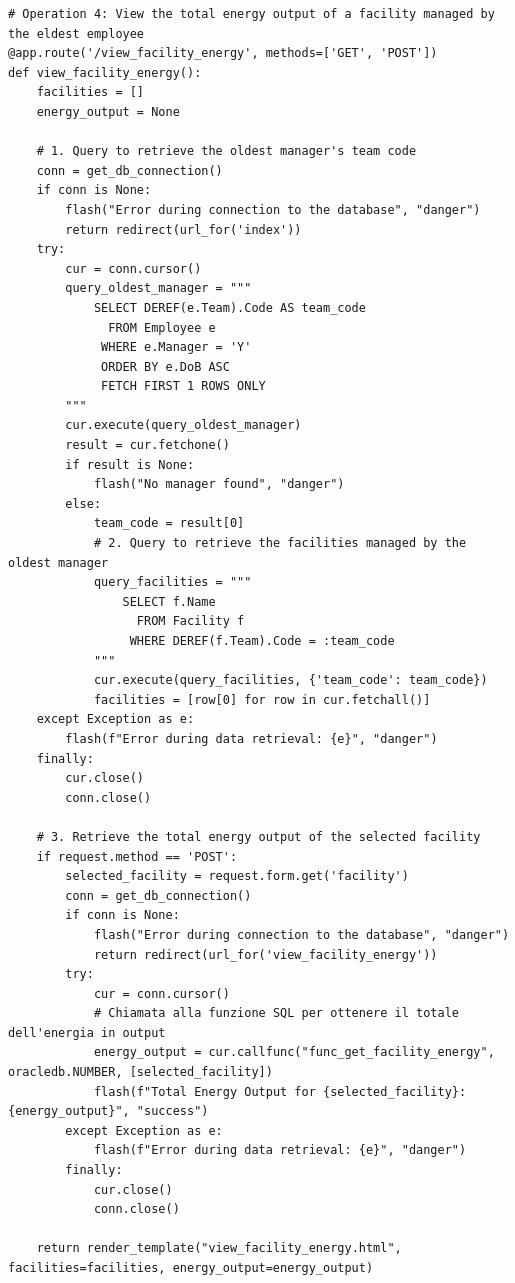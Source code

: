 \begin{lstlisting}
# Operation 4: View the total energy output of a facility managed by the eldest employee
@app.route('/view_facility_energy', methods=['GET', 'POST'])
def view_facility_energy():
    facilities = []
    energy_output = None

    # 1. Query to retrieve the oldest manager's team code
    conn = get_db_connection()
    if conn is None:
        flash("Error during connection to the database", "danger")
        return redirect(url_for('index'))
    try:
        cur = conn.cursor()
        query_oldest_manager = """
            SELECT DEREF(e.Team).Code AS team_code
              FROM Employee e
             WHERE e.Manager = 'Y'
             ORDER BY e.DoB ASC
             FETCH FIRST 1 ROWS ONLY
        """
        cur.execute(query_oldest_manager)
        result = cur.fetchone()
        if result is None:
            flash("No manager found", "danger")
        else:
            team_code = result[0]
            # 2. Query to retrieve the facilities managed by the oldest manager
            query_facilities = """
                SELECT f.Name 
                  FROM Facility f
                 WHERE DEREF(f.Team).Code = :team_code
            """
            cur.execute(query_facilities, {'team_code': team_code})
            facilities = [row[0] for row in cur.fetchall()]
    except Exception as e:
        flash(f"Error during data retrieval: {e}", "danger")
    finally:
        cur.close()
        conn.close()

    # 3. Retrieve the total energy output of the selected facility
    if request.method == 'POST':
        selected_facility = request.form.get('facility')
        conn = get_db_connection()
        if conn is None:
            flash("Error during connection to the database", "danger")
            return redirect(url_for('view_facility_energy'))
        try:
            cur = conn.cursor()
            # Chiamata alla funzione SQL per ottenere il totale dell'energia in output
            energy_output = cur.callfunc("func_get_facility_energy", oracledb.NUMBER, [selected_facility])
            flash(f"Total Energy Output for {selected_facility}: {energy_output}", "success")
        except Exception as e:
            flash(f"Error during data retrieval: {e}", "danger")
        finally:
            cur.close()
            conn.close()

    return render_template("view_facility_energy.html", facilities=facilities, energy_output=energy_output)


\end{lstlisting}
